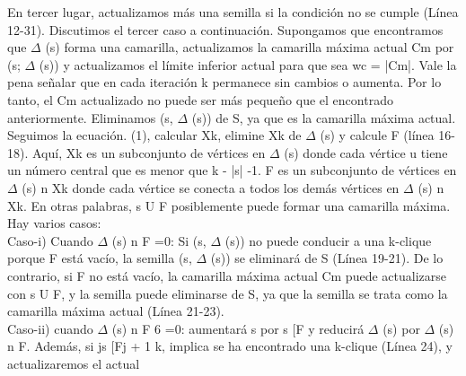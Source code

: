 En tercer lugar, actualizamos más una semilla si la condición no se cumple (Línea 12-31). Discutimos el tercer caso a continuación. Supongamos que encontramos que \begin{math}\Delta\end{math} (s) forma una camarilla, actualizamos la camarilla máxima actual Cm por (s; \begin{math}\Delta\end{math} (s)) y actualizamos el límite inferior actual para que sea wc = |Cm|. Vale la pena señalar que en cada iteración k permanece sin cambios o aumenta. Por lo tanto, el Cm actualizado no puede ser más pequeño que el encontrado anteriormente. Eliminamos (s, \begin{math}\Delta\end{math} (s)) de S, ya que es la camarilla máxima actual. Seguimos la ecuación. (1), calcular Xk, elimine Xk de \begin{math}\Delta\end{math} (s) y calcule F (línea 16-18). Aquí, Xk es un subconjunto de vértices en \begin{math}\Delta\end{math} (s) donde cada vértice u tiene un número central que es menor que k - |s| -1. F es un subconjunto de vértices en \begin{math}\Delta\end{math} (s) n Xk donde cada vértice se conecta a todos los demás vértices en \begin{math}\Delta\end{math} (s) n Xk. En otras palabras, s U F posiblemente puede formar una camarilla máxima. Hay varios casos:
\\
Caso-i) Cuando \begin{math}\Delta\end{math} (s) n F =0: Si (s, \begin{math}\Delta\end{math} (s)) no puede conducir a una k-clique porque F está vacío, la semilla (s, \begin{math}\Delta\end{math} (s)) se eliminará de S (Línea 19-21). De lo contrario, si F no está vacío, la camarilla máxima actual Cm puede actualizarse con s U F, y la semilla puede eliminarse de S, ya que la semilla se trata como la camarilla máxima actual (Línea 21-23).
\\
Caso-ii) cuando \begin{math}\Delta\end{math} (s) n F 6 =0: aumentará s por s [F y reducirá \begin{math}\Delta\end{math} (s) por \begin{math}\Delta\end{math} (s) n F. Además, si js [Fj + 1 k, implica se ha encontrado una k-clique (Línea 24), y actualizaremos el actual
